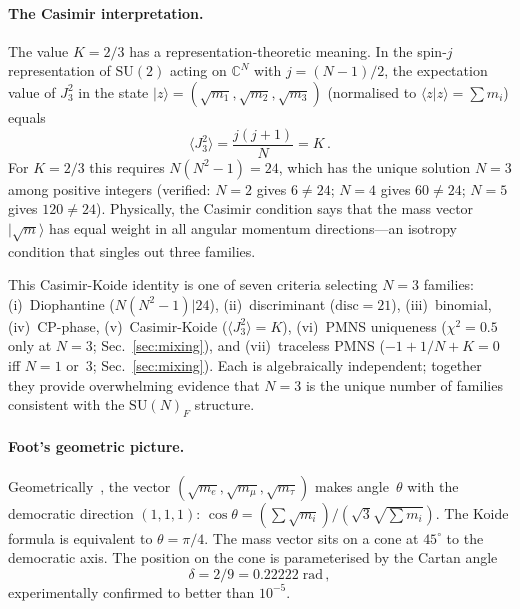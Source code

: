 \documentclass[aps,prd,twocolumn,showpacs,preprintnumbers,superscriptaddress]{revtex4-2}
\newcommand{\SU}{\mathrm{SU}}
\begin{document}
\paragraph{The Casimir interpretation.}

The value $K = 2/3$ has a representation-theoretic meaning.
In the spin-$j$ representation of $\SU(2)$ acting on
$\mathbb{C}^N$ with $j = (N-1)/2$, the expectation value of
$J_3^2$ in the state $|z\rangle = (\sqrt{m_1}, \sqrt{m_2},
\sqrt{m_3})$ (normalised to $\langle z|z\rangle = \sum m_i$)
equals
\begin{equation}
  \langle J_3^2\rangle = \frac{j(j+1)}{N} = K\,.
  \label{eq:casimir}
\end{equation}
For $K = 2/3$ this requires $N(N^2-1) = 24$, which has the
unique solution $N = 3$ among positive integers (verified:
$N=2$ gives $6 \neq 24$; $N=4$ gives $60 \neq 24$; $N=5$
gives $120 \neq 24$).
Physically, the Casimir condition says that the mass vector
$|\sqrt{m}\rangle$ has equal weight in all angular momentum
directions---an isotropy condition that singles out three
families.

This Casimir-Koide identity is one of seven criteria
selecting $N = 3$ families:
(i)~Diophantine ($N(N^2-1)|24$),
(ii)~discriminant ($\mathrm{disc} = 21$),
(iii)~binomial,
(iv)~CP-phase,
(v)~Casimir-Koide ($\langle J_3^2\rangle = K$),
(vi)~PMNS uniqueness ($\chi^2 = 0.5$ only at $N = 3$;
  Sec.~\ref{sec:mixing}), and
(vii)~traceless PMNS ($-1 + 1/N + K = 0$ iff $N = 1$ or~$3$;
  Sec.~\ref{sec:mixing}).
Each is algebraically independent; together they provide
overwhelming evidence that $N = 3$ is the unique number of
families consistent with the $\SU(N)_F$ structure.

\paragraph{Foot's geometric picture.}

Geometrically~\cite{Foot:1994}, the vector
$(\sqrt{m_e}, \sqrt{m_\mu}, \sqrt{m_\tau})$ makes
angle~$\theta$ with the democratic direction $(1,1,1)$:
$\cos\theta = (\sum\sqrt{m_i})/(\sqrt{3}\sqrt{\sum m_i})$.
The Koide formula is equivalent to $\theta = \pi/4$.
The mass vector sits on a cone at $45^\circ$ to the
democratic axis.  The position on the cone is parameterised
by the Cartan angle
\begin{equation}
  \delta = 2/9 = 0.22222\;\text{rad}\,,
  \label{eq:delta}
\end{equation}
experimentally confirmed to better than $10^{-5}$.
\end{document}
